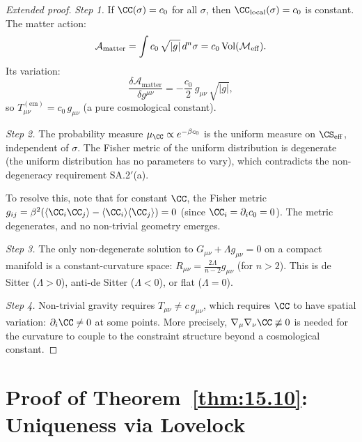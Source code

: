 \begin{proof}[Extended proof]
\emph{Step 1.}  If $\CC(\sigma) = c_0$ for all $\sigma$, then
$\CC_{\mathrm{local}}(\sigma) = c_0$ is constant.  The matter action:
\[
  \mathcal{A}_{\mathrm{matter}} = \int c_0\,\sqrt{|g|}\,d^n\sigma
  = c_0\,\mathrm{Vol}(\mathcal{M}_{\mathrm{eff}}).
\]
Its variation:
\[
  \frac{\delta\mathcal{A}_{\mathrm{matter}}}{\delta g^{\mu\nu}}
  = -\frac{c_0}{2}\,g_{\mu\nu}\,\sqrt{|g|},
\]
so $T_{\mu\nu}^{(\mathrm{em})} = c_0\,g_{\mu\nu}$ (a pure cosmological
constant).

\emph{Step 2.}  The probability measure $\mu_\CC \propto e^{-\beta c_0}$
is the uniform measure on $\CS_{\mathrm{eff}}$, independent of $\sigma$.
The Fisher metric of the uniform distribution is degenerate (the
uniform distribution has no parameters to vary), which contradicts
the non-degeneracy requirement SA.2$'$(a).

To resolve this, note that for constant $\CC$, the Fisher metric
$g_{ij} = \beta^2(\langle\CC_i\CC_j\rangle - \langle\CC_i\rangle
\langle\CC_j\rangle) = 0$ (since $\CC_i = \partial_i c_0 = 0$).
The metric degenerates, and no non-trivial geometry emerges.

\emph{Step 3.}  The only non-degenerate solution to
$G_{\mu\nu} + \Lambda g_{\mu\nu} = 0$ on a compact manifold is a
constant-curvature space: $R_{\mu\nu} = \frac{2\Lambda}{n-2}g_{\mu\nu}$
(for $n > 2$).  This is de Sitter ($\Lambda > 0$), anti-de Sitter
($\Lambda < 0$), or flat ($\Lambda = 0$).

\emph{Step 4.}  Non-trivial gravity requires
$T_{\mu\nu} \neq c\,g_{\mu\nu}$, which requires $\CC$ to have spatial
variation: $\partial_i\CC \neq 0$ at some points.  More precisely,
$\nabla_\mu\nabla_\nu\CC \not\equiv 0$ is needed for the curvature
to couple to the constraint structure beyond a cosmological constant.
\end{proof}

\section{Proof of Theorem~\ref{thm:15.10}: Uniqueness via Lovelock}
\label{app:pf-uniqueness}

